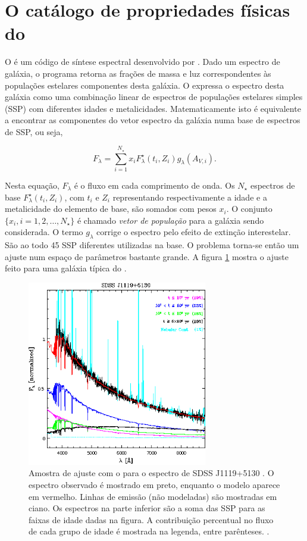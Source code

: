 \section{O catálogo de propriedades físicas do \STARLIGHT}
\label{sec:Intro:Starlight}

O \starlight é um código de síntese espectral desenvolvido por
\citet{CidFernandes2005}. Dado um espectro de galáxia, o programa retorna as
frações de massa e luz correspondentes às populações estelares componentes desta
galáxia. O \starlight expressa o espectro desta galáxia como uma combinação
linear de espectros de populações estelares simples (SSP) com diferentes idades
e metalicidades. Matematicamente isto é equivalente a encontrar as componentes
do vetor espectro da galáxia numa base de espectros de SSP, ou seja,

$$ F_\lambda = \sum_{i=1}^{N_\star} x_i F^\star_\lambda(t_i,Z_i)
g_\lambda(A_{V,i}). $$

Nesta equação, $F_\lambda$ é o fluxo em cada comprimento de onda. Os $N_\star$
espectros de base $F^\star_\lambda(t_i, Z_i)$, com $t_i$ e $Z_i$ representando
respectivamente a idade e a metalicidade do elemento de base, são somados com
pesos $x_i$. O conjunto $\{x_i, i=1,2,\ldots,N_\star\}$ é chamado {\em vetor de
população} para a galáxia sendo considerada. O termo $g_\lambda$ corrige o
espectro pelo efeito de extinção interestelar. São ao todo 45 SSP diferentes
utilizadas na base. O problema torna-se então um ajuste num espaço de parâmetros
bastante grande. A figura \ref{fig:StarlightSpectrumSample} mostra o ajuste
feito para uma galáxia típica do \SDSS.

\begin{figure}
	\includegraphics[width=0.7\textwidth]{figuras/starlight-fit.eps}
	\caption[Amostra de ajuste de espectro com o \starlight.]
	{Amostra de ajuste com o \starlight para o espectro de SDSS
	J1119+5130 \citep[figura 2]{CidFernandes2006}. O espectro observado é mostrado
	em preto, enquanto o modelo aparece em vermelho. Linhas de emissão (não
	modeladas) são mostradas em ciano. Os espectros na parte inferior são a soma
	das SSP para as faixas de idade dadas na figura. A contribuição percentual no
	fluxo de cada grupo de idade é mostrada na legenda, entre parênteses.
	\starlight.}
	\label{fig:StarlightSpectrumSample}
\end{figure}

